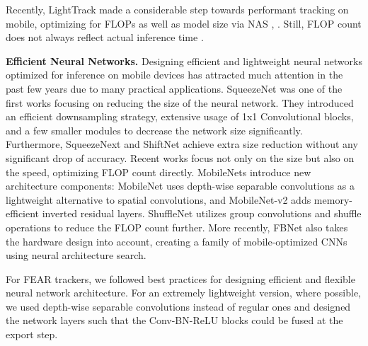 \documentclass[runningheads]{llncs}
\begin{document}
Recently, LightTrack \cite{LightTrack} made a considerable step towards performant tracking on mobile, optimizing for FLOPs as well as model size via NAS \cite{nas}, \cite{detnas}. 
Still, FLOP count does not always reflect actual inference time \cite{FBNet}.





































\textbf{Efficient Neural Networks.} Designing efficient and lightweight neural networks optimized for inference on mobile devices has attracted much attention in the past few years due to many practical applications. 
SqueezeNet \cite{SqueezeNet} was one of the first works focusing on reducing the size of the neural network.
They introduced an efficient downsampling strategy, extensive usage of 1x1 Convolutional blocks, and a few smaller modules to decrease the network size significantly. 
Furthermore, SqueezeNext \cite{SqueezeNext} and ShiftNet \cite{shift} achieve extra size reduction without any significant drop of accuracy. 
Recent works focus not only on the size but also on the speed, optimizing FLOP count directly. 
MobileNets introduce new architecture components: MobileNet \cite{MobileNet} uses depth-wise separable convolutions as a lightweight alternative to spatial convolutions, and MobileNet-v2 \cite{mobilenetv2} adds memory-efficient inverted residual layers.
ShuffleNet \cite{shufflenet} utilizes group convolutions and shuffle operations to reduce the FLOP count further. 
More recently, FBNet \cite{FBNet} also takes the hardware design into account, creating a family of mobile-optimized CNNs using neural architecture search. 

For FEAR trackers, we followed best practices for designing efficient and flexible neural network architecture. For an extremely lightweight version, where possible, we used depth-wise separable convolutions instead of regular ones and designed the network layers such that the Conv-BN-ReLU blocks could be fused at the export step.
\end{document}
